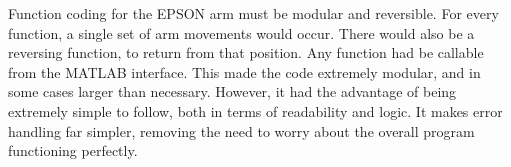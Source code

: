 Function coding for the EPSON arm must be modular and reversible. For every function, a single set of arm movements would occur. There would also be a reversing function, to return from that position. Any function had be callable from the MATLAB interface. This made the code extremely modular, and in some cases larger than necessary. However, it had the advantage of being extremely simple to follow, both in terms of readability and logic. It makes error handling far simpler, removing the need to worry about the overall program functioning perfectly.

 
 
% 
